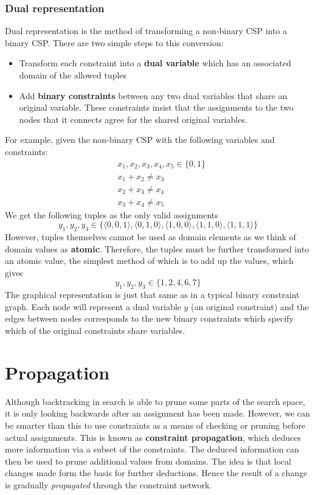 \documentclass[CS4402-Notes.tex]{subfiles}
\begin{document}
\subsubsection{Dual representation}
Dual representation is the method of transforming a non-binary CSP into a binary CSP. There are two simple steps to this conversion:
\begin{itemize}
\item Transform each constraint into a \textbf{dual variable} which has an associated domain of the allowed tuples
\item Add \textbf{binary constraints} between any two dual variables that share an original variable. These constraints insist that the assignments to the two nodes that it connects agree for the shared original variables.
\end{itemize}
For example, given the non-binary CSP with the following variables and constraints:
\begin{align}
  & x_1, x_2, x_3, x_4, x_5 \in \{0,1\} \\
  & x_1 + x_2 \neq x_3 \\
  & x_2 + x_3 \neq x_4 \\
  & x_3 + x_4 \neq x_5
\end{align}
We get the following tuples as the only valid assignments
\begin{equation}
y_1, y_2, y_3 \in \{\langle 0,0,1 \rangle, \langle 0,1,0 \rangle, \langle 1,0,0 \rangle, \langle 1,1,0 \rangle, \langle 1,1,1 \rangle \}
\end{equation}
However, tuples themselves cannot be used as domain elements as we think of domain values as \textbf{atomic}. Therefore, the tuples must be further transformed into an atomic value, the simplest method of which is to add up the values, which gives
\begin{equation}
y_1, y_2, y_3 \in \{1, 2, 4, 6, 7\}
\end{equation}
The graphical representation is just that same as in a typical binary constraint graph. Each node will represent a dual variable $y$ (an original constraint) and the edges between nodes corresponds to the new binary constraints which specify which of the original constraints share variables.

\section{Propagation}
Although backtracking in search is able to prune some parts of the search space, it is only looking backwards after an assignment has been made. However, we can be smarter than this to use constraints as a means of checking or pruning before actual assignments. This is known as \textbf{constraint propagation}, which deduces more information via a subset of the constraints. The deduced information can then be used to prune additional values from domains. 
\n
The idea is that local changes made form the basis for further deductions. Hence the result of a change is gradually \textit{propagated} through the constraint network.
\end{document}
